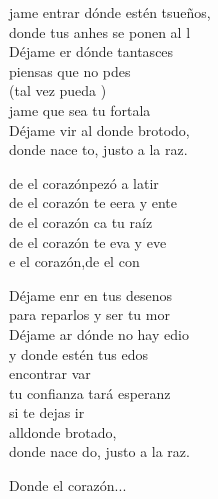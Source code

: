 \begin{cancion}%
	jame entrar dónde estén tsueños,\\
	donde tus anhes se ponen al l  \\
	Déjame er dónde tantasces  \\
	piensas que no pdes \\
	(tal vez pueda )\\
	jame que sea tu fortala  \\
	Déjame vir al donde brotodo, \\
	donde nace to, justo a la raz. \jump\\
	\begin{chorus}%
		de el corazónpezó a latir  \\
		de el corazón te eera y ente  \\
		de el corazón ca tu raíz  \\
		de el corazón te eva y eve  \\
		e el corazón,de el con  \jump\\
	\end{chorus}%
	Déjame enr en tus desenos  \\
	para reparlos y ser tu mor  \\
	Déjame ar dónde no hay edio \\
	y donde estén tus edos \\
	encontrar var \\
	tu confianza tará esperanz\\
	\jump
si te dejas ir \\
	alldonde brotado,\\
	donde nace do, justo a la raz.\jump\\
	\begin{chorus}%
	Donde el corazón... \jump\\

\end{chorus}
\end{cancion}
